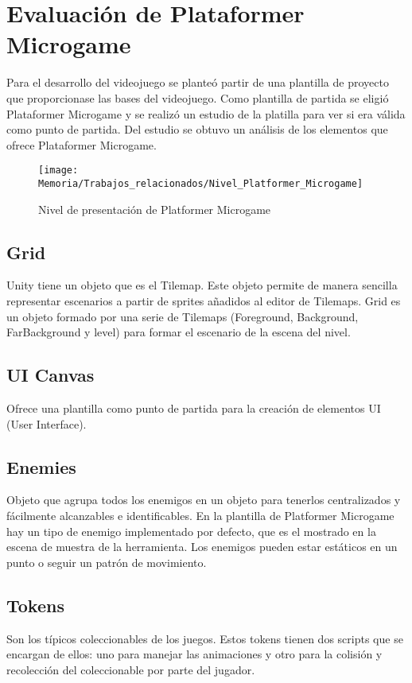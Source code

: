 \section{Evaluación de Plataformer Microgame \cite{PlatformerMicrogame}}
Para el desarrollo del videojuego se planteó partir de una plantilla de proyecto que proporcionase las bases del videojuego. Como plantilla de partida se eligió Plataformer Microgame y se realizó un estudio de la platilla para ver si era válida como punto de partida. Del estudio se obtuvo un análisis de los elementos que ofrece Plataformer Microgame.

\begin{figure}[h]
\centering
\texttt{[image: Memoria/Trabajos\_relacionados/Nivel\_Platformer\_Microgame]}
\caption{Nivel de presentación de Platformer Microgame}
\end{figure}

\subsection{Grid}
Unity tiene un objeto que es el Tilemap. Este objeto permite de manera sencilla representar escenarios a partir de sprites añadidos al editor de Tilemaps. Grid es un objeto formado por una serie de Tilemaps (Foreground, Background, FarBackground y level) para formar el escenario de la escena del nivel.

\subsection{UI Canvas}
Ofrece una plantilla como punto de partida para la creación de elementos UI (User Interface).

\subsection{Enemies}
Objeto que agrupa todos los enemigos en un objeto para tenerlos centralizados y fácilmente alcanzables e identificables. En la plantilla de Platformer Microgame hay un tipo de enemigo implementado por defecto, que es el mostrado en la escena de muestra de la herramienta. Los enemigos pueden estar estáticos en un punto o seguir un patrón de movimiento.

\subsection{Tokens}
Son los típicos coleccionables de los juegos. Estos tokens tienen dos scripts que se encargan de ellos: uno para manejar las animaciones y otro para la colisión y recolección del coleccionable por parte del jugador.

